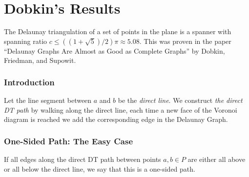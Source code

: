 \documentclass{tufte-handout}
\begin{document}
\newpage

\part{Dobkin's Results}

The Delaunay triangulation of a set of points in the plane is a
spanner with spanning ratio $c \le ((1 + \sqrt{5})/2)\pi \approx
5.08$.  This was proven in the paper ``Delaunay Graphs Are Almost as
Good as Complete Graphs'' by Dobkin, Friedman, and Supowit.  
\cite{Dobkin:1987} \cite{Dobkin:1990}

\section{Introduction}

Let the line segment between $a$ and $b$ be the \emph{direct line}.
We construct \emph{the direct DT path} by walking along the direct
line, each time a new face of the Voronoi diagram is reached we add
the corresponding edge in the Delaunay Graph.

\section{One-Sided Path: The Easy Case}

If all edges along the direct DT path between points $a,b \in P$ are
either all above or all below the direct line, we say that this is a
one-sided path.
\end{document}

